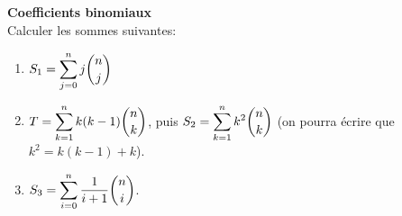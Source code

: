 \documentclass[a4paper, 11pt,reqno]{article}
\begin{document}
























\begin{exercice} \; \textbf{Coefficients binomiaux} \\
Calculer les sommes suivantes: 
\begin{enumerate}
\item $S_1 = \displaystyle \sum\limits_{j=0}^n j\displaystyle \binom{n}{j}$
\item $T = \displaystyle \sum\limits_{k=1}^n k(k-1)\displaystyle \binom{n}{k}$, puis $S_2 = \displaystyle \sum\limits_{k=1}^n k^2\displaystyle \binom{n}{k}$ (on pourra \'ecrire que $k^2=k(k-1)+k$).
\item $S_3= \displaystyle \sum\limits_{i=0}^n \displaystyle\frac{1}{i+1}\displaystyle \binom{n}{i}$.
\end{enumerate}
\end{exercice}
\end{document}
